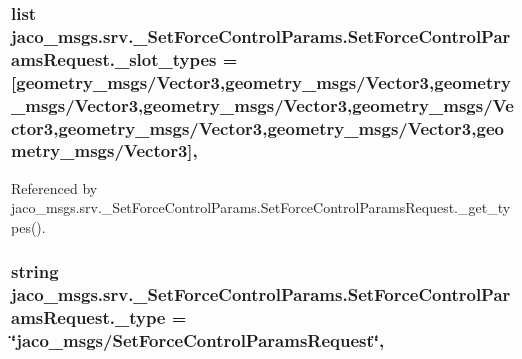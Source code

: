 \subsubsection[{\texorpdfstring{\+\_\+slot\+\_\+types}{_slot_types}}]{\setlength{\rightskip}{0pt plus 5cm}list jaco\+\_\+msgs.\+srv.\+\_\+\+Set\+Force\+Control\+Params.\+Set\+Force\+Control\+Params\+Request.\+\_\+slot\+\_\+types = \mbox{[}\textquotesingle{}geometry\+\_\+msgs/Vector3\textquotesingle{},\textquotesingle{}geometry\+\_\+msgs/Vector3\textquotesingle{},\textquotesingle{}geometry\+\_\+msgs/Vector3\textquotesingle{},\textquotesingle{}geometry\+\_\+msgs/Vector3\textquotesingle{},\textquotesingle{}geometry\+\_\+msgs/Vector3\textquotesingle{},\textquotesingle{}geometry\+\_\+msgs/Vector3\textquotesingle{},\textquotesingle{}geometry\+\_\+msgs/Vector3\textquotesingle{},\textquotesingle{}geometry\+\_\+msgs/Vector3\textquotesingle{}\mbox{]}\hspace{0.3cm}{\ttfamily [static]}, {\ttfamily [private]}}\hypertarget{classjaco__msgs_1_1srv_1_1__SetForceControlParams_1_1SetForceControlParamsRequest_a63633167cd908fb0ef6d893211cef0d4}{}\label{classjaco__msgs_1_1srv_1_1__SetForceControlParams_1_1SetForceControlParamsRequest_a63633167cd908fb0ef6d893211cef0d4}


Referenced by jaco\+\_\+msgs.\+srv.\+\_\+\+Set\+Force\+Control\+Params.\+Set\+Force\+Control\+Params\+Request.\+\_\+get\+\_\+types().

\subsubsection[{\texorpdfstring{\+\_\+type}{_type}}]{\setlength{\rightskip}{0pt plus 5cm}string jaco\+\_\+msgs.\+srv.\+\_\+\+Set\+Force\+Control\+Params.\+Set\+Force\+Control\+Params\+Request.\+\_\+type = \char`\"{}jaco\+\_\+msgs/{\bf Set\+Force\+Control\+Params\+Request}\char`\"{}\hspace{0.3cm}{\ttfamily [static]}, {\ttfamily [private]}}\hypertarget{classjaco__msgs_1_1srv_1_1__SetForceControlParams_1_1SetForceControlParamsRequest_a21a4bdfc6b7757d0e04bf1b69880aa08}{}\label{classjaco__msgs_1_1srv_1_1__SetForceControlParams_1_1SetForceControlParamsRequest_a21a4bdfc6b7757d0e04bf1b69880aa08}
